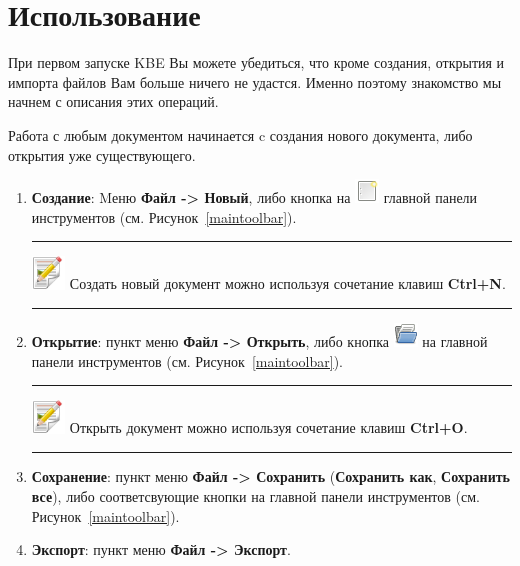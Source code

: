 \newpage
\section{Использование}
\label{usage}

При первом запуске KBE Вы можете убедиться, что кроме создания, открытия и импорта файлов Вам больше ничего не удастся. Именно поэтому знакомство мы начнем с описания этих операций.

Работа с любым документом начинается c создания нового документа, либо открытия уже существующего.
\begin{enumerate}
	\item \textbf{Создание}: Mеню \textbf{Файл -> Новый}, либо кнопка на \includegraphics{../images/document-new.png} главной панели инструментов (см. Рисунок~\ref{maintoolbar}).
	\hrule
	\smallskip
	\noindent\includegraphics[width=25pt, height=25pt]{../images/note.png} \textcolor[rgb]{.67,.05,.05}{Создать новый документ можно используя сочетание клавиш \textbf{Ctrl+N}.}
	\smallskip
	\hrule

	\item \textbf{Открытие}: пункт меню \textbf{Файл -> Открыть}, либо кнопка \includegraphics{../images/document-open.png} на главной панели инструментов (см. Рисунок~\ref{maintoolbar}).
	\hrule
	\smallskip
	\noindent\includegraphics[width=25pt, height=25pt]{../images/note.png} \textcolor[rgb]{.67,.05,.05}{Открыть документ можно используя сочетание клавиш \textbf{Ctrl+O}.}
	\smallskip
	\hrule

	\item \textbf{Сохранение}: пункт меню \textbf{Файл -> Сохранить} (\textbf{Сохранить как}, \textbf{Сохранить все}), либо соответсвующие кнопки на главной панели инструментов (см. Рисунок~\ref{maintoolbar}).

	\item \textbf{Экспорт}: пункт меню \textbf{Файл -> Экспорт}.
\end{enumerate}

